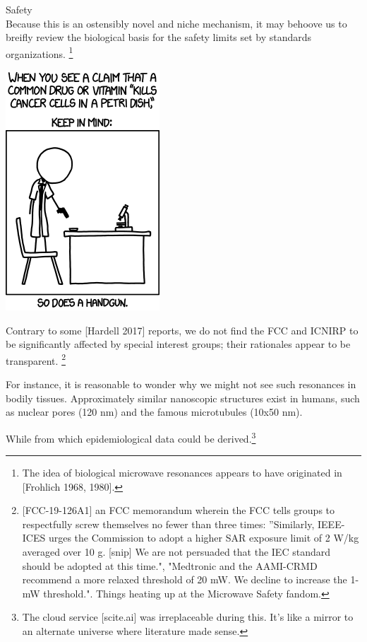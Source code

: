 \documentclass[fleqn,10pt]{article}
\begin{document}
\clearpage
\begin{multicols}{1}
{\Large Safety}\\



Because this is an ostensibly novel and niche mechanism, it may behoove us to breifly review the biological basis for the safety limits set by standards organizations. \footnote{The idea of biological microwave resonances appears to have originated in [Frohlich 1968, 1980].}


\includegraphics[scale=0.5]{cells.png}


Contrary to some [Hardell 2017] reports, we do not find the FCC and ICNIRP to be significantly affected by special interest groups; their rationales appear to be transparent. 
\footnote{[FCC-19-126A1] an FCC memorandum wherein the FCC tells groups to respectfully screw themselves no fewer than three times: ''Similarly, IEEE-ICES urges the Commission to
adopt a higher SAR exposure limit of 2 W/kg averaged over 10 g. [snip] We are not persuaded that the IEC standard should be adopted at this time.", "Medtronic and the AAMI-CRMD recommend a more relaxed threshold of 20 mW. We decline to increase the 1-mW threshold.". Things heating up at the Microwave Safety fandom.}


For instance, it is reasonable to wonder why we might not see such resonances in bodily tissues. Approximately similar nanoscopic structures exist in humans, such as nuclear pores (120 nm) and the famous microtubules (10x50 nm). 

While from which epidemiological data could be derived.\footnote{The cloud service [scite.ai] was irreplaceable during this. It's like a mirror to an alternate universe where literature made sense.}


\end{multicols}
\end{document}
